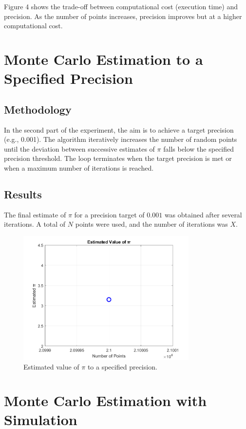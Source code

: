 \documentclass{article}
\begin{document}
Figure 4 shows the trade-off between computational cost (execution time) and precision. As the number of points increases, precision improves but at a higher computational cost.

\section{Monte Carlo Estimation to a Specified Precision}
\subsection{Methodology}
In the second part of the experiment, the aim is to achieve a target precision (e.g., 0.001). The algorithm iteratively increases the number of random points until the deviation between successive estimates of $\pi$ falls below the specified precision threshold. The loop terminates when the target precision is met or when a maximum number of iterations is reached.

\subsection{Results}
The final estimate of $\pi$ for a precision target of $0.001$ was obtained after several iterations. A total of $N$ points were used, and the number of iterations was $X$.

\begin{figure}[H]
	\centering
	\includegraphics[width=0.8\textwidth]{Result_Files/pi_estimation_precision_plot.png}
	\caption{Estimated value of $\pi$ to a specified precision.}
	\label{fig:precision_estimation}
\end{figure}

\section{Monte Carlo Estimation with Simulation}
\end{document}
